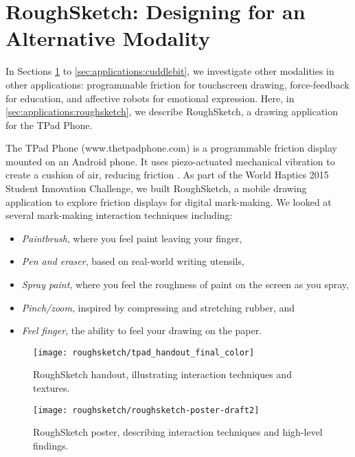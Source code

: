 \section{RoughSketch: Designing for an Alternative Modality}
\label{sec:applications:roughsketch}

In Sections \ref{sec:applications:roughsketch} to \ref{sec:applications:cuddlebit}, we investigate other modalities in other applications: programmable friction for touchscreen drawing, force-feedback for education, and affective robots for emotional expression.
Here, in \autoref{sec:applications:roughsketch}, we describe RoughSketch, a drawing application for the TPad Phone.

The TPad Phone (www.thetpadphone.com) is a programmable friction display mounted on an Android phone.
It uses piezo-actuated mechanical vibration to create a cushion of air, reducing friction \cite{Winfield2007}.
As part of the World Haptics 2015 Student Innovation Challenge, we built RoughSketch, a mobile drawing application to explore friction displays for digital mark-making.
We looked at several mark-making interaction techniques including:
\begin{itemize}
    \item \textit{Paintbrush}, where you feel paint leaving your finger,
    \item \textit{Pen and eraser}, based on real-world writing utensils,
    \item \textit{Spray paint}, where you feel the roughness of paint on the screen as you spray,
    \item \textit{Pinch/zoom}, inspired by compressing and stretching rubber, and
    \item \textit{Feel finger}, the ability to feel your drawing on the paper.
\end{itemize}

\begin{figure}[htbp] %
   \centering
   \texttt{[image: roughsketch/tpad\_handout\_final\_color]} 
   \caption{RoughSketch handout, illustrating interaction techniques and textures.}
   \label{fig:roughsketch:handout}
\end{figure}

\begin{figure}[htbp] %
   \centering
   \texttt{[image: roughsketch/roughsketch-poster-draft2]} 
   \caption{RoughSketch poster, describing interaction techniques and high-level findings.}
   \label{fig:roughsketch:poster}
\end{figure}

